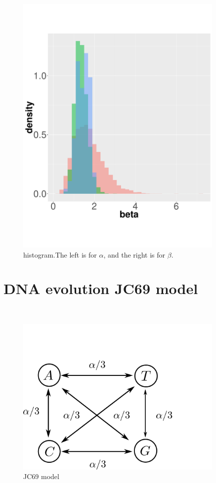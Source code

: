 \begin{figure}
\begin{minipage}[!hp]{0.45\linewidth}
    \includegraphics [width=0.90\textwidth, angle=0]{figs/hist_beta.pdf}
    \vspace{-0 in}
  \end{minipage}
    \caption{histogram.The left is for $\alpha$, and the right is for $\beta$.}
     \label{fig:hist}
  \end{figure}
  

\section{DNA evolution JC69 model }~
  \begin{figure}%
  \centering
  \begin{minipage}[!hp]{0.45\linewidth}
  \centering
    \includegraphics [width=0.90\textwidth, angle=0]{figs/jc_model.pdf}
    \caption{JC69 model}
      \end{minipage}
	\label{jc_model}
  \end{figure}

